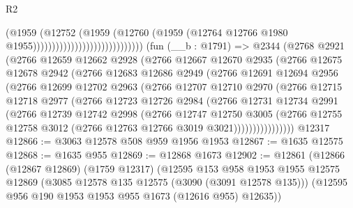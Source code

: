 \begin{lexlean}{R2}
\begin{coremodule}
                                                  (@1959
                                                    (@12752
                                                      (@1959
                                                        (@12760
                                                          (@1959
                                                            (@12764
                                                              @12766
                                                              @1980
                                                              @1955)))))))))))))))))))))))))))))
    (fun (__b : @1791) =>
    @2344
      (@2768
        @2921
        (@2766
          @12659
          @12662
          @2928
          (@2766
            @12667
            @12670
            @2935
            (@2766
              @12675
              @12678
              @2942
              (@2766
                @12683
                @12686
                @2949
                (@2766
                  @12691
                  @12694
                  @2956
                  (@2766
                    @12699
                    @12702
                    @2963
                    (@2766
                      @12707
                      @12710
                      @2970
                      (@2766
                        @12715
                        @12718
                        @2977
                        (@2766
                          @12723
                          @12726
                          @2984
                          (@2766
                            @12731
                            @12734
                            @2991
                            (@2766
                              @12739
                              @12742
                              @2998
                              (@2766
                                @12747
                                @12750
                                @3005
                                (@2766
                                  @12755
                                  @12758
                                  @3012
                                  (@2766 @12763 @12766 @3019 @3021))))))))))))))))
    @12317
@12866 := @3063 @12578 @508 @959 @1956 @1953
@12867 := @1635 @12575
@12868 := @1635 @955
@12869 := @12868 @1673
@12902 := @12861
    (@12866
      (@12867 @12869)
      (@1759 @12317)
      (@12595
        @153
        @958
        @1953
        @1955
        @12575
        @12869
        (@3085 @12578 @135 @12575 (@3090 (@3091 @12578 @135)))
        (@12595 @956 @190 @1953 @1953 @955 @1673 (@12616 @955) @12635))

\end{coremodule}
\end{lexlean}
